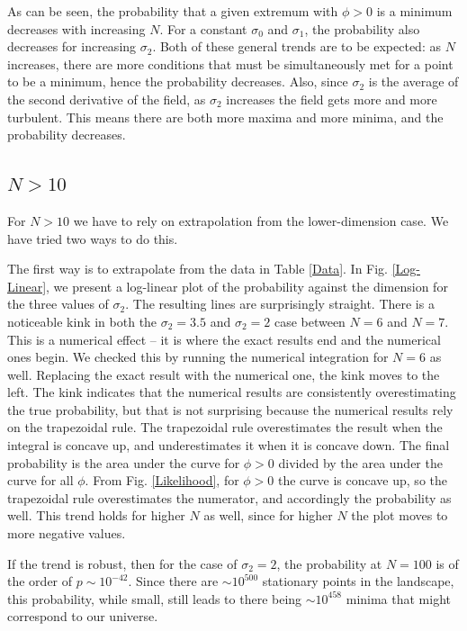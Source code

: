 \documentclass[12pt]{article}
\begin{document}
As can be seen, the probability that a given extremum with $\phi > 0$ is a minimum decreases with increasing $N$. For a constant $\sigma_0$ and $\sigma_1$, the probability also decreases for increasing $\sigma_2$. Both of these general trends are to be expected: as $N$ increases, there are more conditions that must be simultaneously met for a point to be a minimum, hence the probability decreases. Also, since $\sigma_2$ is the average of the second derivative of the field, as $\sigma_2$ increases the field gets more and more turbulent. This means there are both more maxima and more minima, and the probability decreases.

\subsection{$N > 10$}
For $N > 10$ we have to rely on extrapolation from the lower-dimension case. We have tried two ways to do this.

The first way is to extrapolate from the data in Table \ref{Data}. In Fig. \ref{Log-Linear}, we present a log-linear plot of the probability against the dimension for the three values of $\sigma_2$. The resulting lines are surprisingly straight. There is a noticeable kink in both the $\sigma_2 = 3.5$ and $\sigma_2=2$ case between $N=6$ and $N=7$. This is a numerical effect -- it is where the exact results end and the numerical ones begin. We checked this by running the numerical integration for $N=6$ as well. Replacing the exact result with the numerical one, the kink moves to the left. The kink indicates that the numerical results are consistently overestimating the true probability, but that is not surprising because the numerical results rely on the trapezoidal rule. The trapezoidal rule overestimates the result when the integral is concave up, and underestimates it when it is concave down. The final probability is the area under the curve for $\phi > 0$ divided by the area under the curve for all $\phi$. From Fig. \ref{Likelihood}, for $\phi > 0$ the curve is concave up, so the trapezoidal rule overestimates the numerator, and accordingly the probability as well. This trend holds for higher $N$ as well, since for higher $N$ the plot moves to more negative values.

If the trend is robust, then for the case of $\sigma_2=2$, the probability at $N=100$ is of the order of $p \sim 10^{-42}$. Since there are $\sim 10^{500}$ stationary points in the landscape,\cite{Douglas} this probability, while small, still leads to there being $\sim 10^{458}$ minima that might correspond to our universe.
\end{document}
